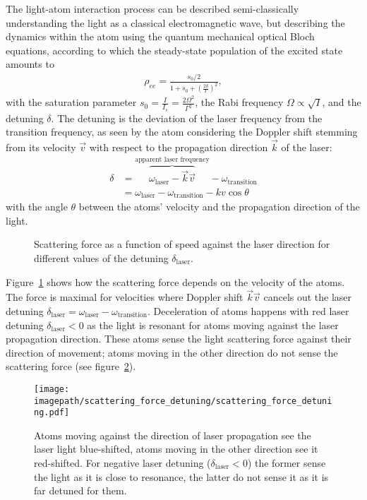The light-atom interaction process can be described semi-classically understanding the light as a classical electromagnetic wave, but describing the dynamics within the atom using the quantum mechanical optical Bloch equations, according to which the steady-state population of the excited state amounts to
\begin{align}
    \rho_{ee} = \frac{s_0/2}{1 + s_0 + {\left(\frac{2\delta}{\Gamma}\right)}^2},
\end{align}
with the saturation parameter $s_0 = \frac{I}{I_s} = \frac{2\Omega^2}{\Gamma^2}$, the Rabi frequency $\Omega \propto \sqrt{I}$, and the detuning $\delta$. The detuning is the deviation of the laser frequency from the transition frequency, as seen by the atom considering the Doppler shift stemming from its velocity $\vec v$ with respect to the propagation direction $\vec k$ of the laser:
\begin{align}
    \delta &= \overbrace{\omega_\text{laser} - \vec k \vec v }^\text{apparent laser frequency}- \omega_\text{transition} \\
    \nonumber & = \omega_\text{laser}  - \omega_\text{transition} - kv \cos \theta
\end{align}
with the angle $\theta$ between the atoms' velocity and the propagation direction of the light.

\begin{figure}
    \centering
    \caption{Scattering force as a function of speed against the laser direction for different values of the detuning $\delta_\text{laser}$.
    }\label{fig:scattering_force_vs_velocity}
\end{figure}

Figure~\ref{fig:scattering_force_vs_velocity} shows how the scattering force depends on the velocity of the atoms. The force is maximal for velocities where Doppler shift $\vec k \vec v$ cancels out the laser detuning $\delta_\text{laser} = \omega_\text{laser} - \omega_\text{transition}$. Deceleration of atoms happens with red laser detuning $\delta_\text{laser} < 0$ as the light is resonant for atoms moving against the laser propagation direction. These atoms sense the light scattering force against their direction of movement; atoms moving in the other direction do not sense the scattering force (see figure~\ref{fig:scattering_force_detuning}).

\begin{figure}
    \centering
    \texttt{[image: \\imagepath/scattering\_force\_detuning/scattering\_force\_detuning.pdf]}
    \caption{Atoms moving against the direction of laser propagation see the laser light blue-shifted, atoms moving in the other direction see it red-shifted. For negative laser detuning ($\delta_\text{laser} < 0$) the former sense the light as it is close to resonance, the latter do not sense it as it is far detuned for them.}\label{fig:scattering_force_detuning}
\end{figure}

